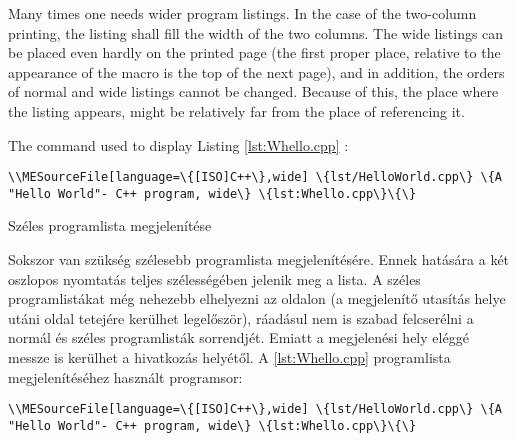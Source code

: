{


Many times one needs wider program listings.
In the case of the two-column printing, 
the listing shall fill the width of the two columns.
The wide listings can be placed even hardly on the printed page
(the first proper place, relative to the appearance of the macro
is the top of the next page), and in addition, the orders of 
normal and wide listings cannot be changed.
Because of this, the place where the listing appears,
might be relatively far from the place of referencing it.

The command used to display Listing \ref{lst:Whello.cpp} :
\par\noindent\lstinline|\\MESourceFile[language=\{[ISO]C++\},wide] \{lst/HelloWorld.cpp\} \{A "Hello World"- C++ program, wide\} \{lst:Whello.cpp\}\{\}|
}
{Széles programlista megjelenítése}
{



Sokszor van szükség szélesebb programlista megjelenítésére. Ennek hatására a két
oszlopos nyomtatás teljes szélességében jelenik meg a lista.
A széles programlistákat még nehezebb elhelyezni az oldalon (a megjelenítő utasítás helye
utáni oldal tetejére kerülhet legelőször), ráadásul nem is szabad
felcserélni a normál és széles programlisták sorrendjét.
Emiatt a megjelenési hely eléggé messze is kerülhet
a hivatkozás helyétől.
A \ref{lst:Whello.cpp} programlista megjelenítéséhez használt programsor:
\par\noindent\lstinline|\\MESourceFile[language=\{[ISO]C++\},wide] \{lst/HelloWorld.cpp\} \{A "Hello World"- C++ program, wide\} \{lst:Whello.cpp\}\{\}|
}


